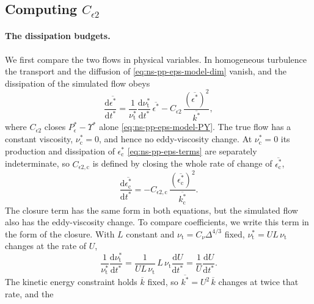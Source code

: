 \documentclass{article}
\begin{document}
\subsection{Computing \texorpdfstring{$C_{\epsilon 2}$}{C epsilon 2}}\label{ssec:hit-ceps2}
\paragraph{The dissipation budgets.}
We first compare the two flows in physical variables. In homogeneous
turbulence the transport and the diffusion of \eqref{eq:ns-pp-eps-model-dim}
vanish, and the dissipation of the simulated flow obeys
\begin{equation}\label{eq:hit-eps-rate-sim-dim}
  \frac{\mathrm{d} \overline{\epsilon^*}}{\mathrm{d} t^*}
  = \frac{1}{\nu_{\mathrm{t}}^*}\frac{\mathrm{d}\nu_{\mathrm{t}}^*}{\mathrm{d}t^*}\, \overline{\epsilon^*}
  - C_{\epsilon 2}\, \frac{\left(\overline{\epsilon^*}\right)^2}{\overline{k^*}} ,
\end{equation}
where $C_{\epsilon 2}$ closes $P_\epsilon^* - \Upsilon^*$ alone
\eqref{eq:ns-pp-eps-model-PY}. The true flow has a constant viscosity,
$\nu_{\mathrm{c}}^* = 0$, and hence no eddy-viscosity change. At
$\nu_{\mathrm{c}}^* = 0$ its production and dissipation of
$\epsilon_{\mathrm{c}}^*$ \eqref{eq:ns-pp-eps-terms} are separately
indeterminate, so $C_{\epsilon 2,\mathrm{c}}$ is defined by closing the whole
rate of change of $\overline{\epsilon_{\mathrm{c}}^*}$,
\begin{equation}\label{eq:hit-eps-rate-true}
  \frac{\mathrm{d} \overline{\epsilon_{\mathrm{c}}^*}}{\mathrm{d} t^*}
  = -C_{\epsilon 2,\mathrm{c}}\, \frac{\left(\overline{\epsilon_{\mathrm{c}}^*}\right)^2}{\overline{k_{\mathrm{c}}^*}} .
\end{equation}
The closure term has the same form in both equations, but the simulated flow
also has the eddy-viscosity change. To compare coefficients, we write this
term in the form of the closure. With $L$ constant and
$\nu_{\mathrm{t}} = C_\nu \Delta^{4/3}$ fixed,
$\nu_{\mathrm{t}}^* = UL\, \nu_{\mathrm{t}}$ changes at the rate of $U$,
\begin{equation}\label{eq:hit-nut-rate-dim}
  \frac{1}{\nu_{\mathrm{t}}^*}\frac{\mathrm{d}\nu_{\mathrm{t}}^*}{\mathrm{d}t^*}
  = \frac{1}{UL\, \nu_{\mathrm{t}}}\, L\, \nu_{\mathrm{t}} \frac{\mathrm{d}U}{\mathrm{d}t^*}
  = \frac{1}{U}\frac{\mathrm{d}U}{\mathrm{d}t^*} .
\end{equation}
The kinetic energy constraint holds $\overline{k}$ fixed, so
$\overline{k^*} = U^2\, \overline{k}$ changes at twice that rate, and the
\end{document}
